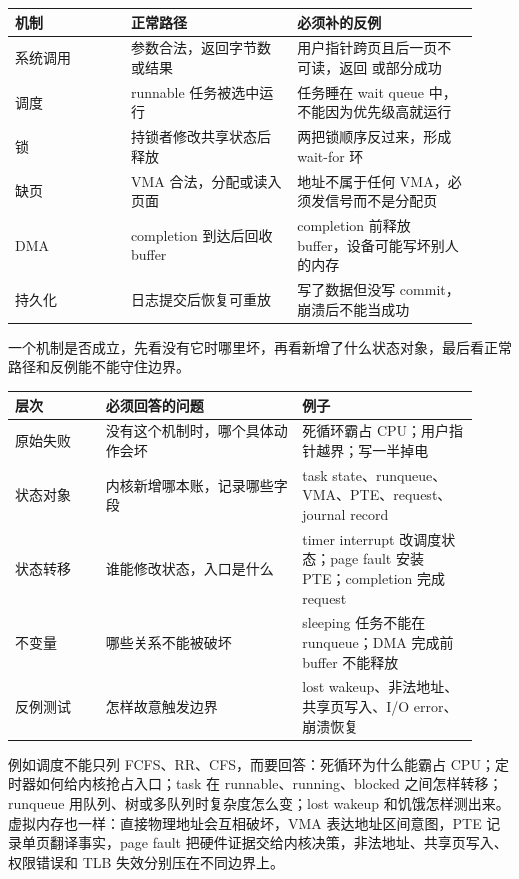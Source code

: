 \begin{longtable}{|L{0.23\linewidth}|L{0.33\linewidth}|L{0.36\linewidth}|}
\toprule
机制 & 正常路径 & 必须补的反例 \\
\midrule
系统调用 & 参数合法，返回字节数或结果 & 用户指针跨页且后一页不可读，返回  或部分成功 \\\tablerowrule
调度 & runnable 任务被选中运行 & 任务睡在 wait queue 中，不能因为优先级高就运行 \\\tablerowrule
锁 & 持锁者修改共享状态后释放 & 两把锁顺序反过来，形成 wait-for 环 \\\tablerowrule
缺页 & VMA 合法，分配或读入页面 & 地址不属于任何 VMA，必须发信号而不是分配页 \\\tablerowrule
DMA & completion 到达后回收 buffer & completion 前释放 buffer，设备可能写坏别人的内存 \\\tablerowrule
持久化 & 日志提交后恢复可重放 & 写了数据但没写 commit，崩溃后不能当成功 \\
\bottomrule
\end{longtable}

一个机制是否成立，先看没有它时哪里坏，再看新增了什么状态对象，最后看正常路径和反例能不能守住边界。

\begin{longtable}{|L{0.18\linewidth}|L{0.39\linewidth}|L{0.35\linewidth}|}
\toprule
层次 & 必须回答的问题 & 例子 \\
\midrule
原始失败 & 没有这个机制时，哪个具体动作会坏 & 死循环霸占 CPU；用户指针越界；写一半掉电 \\\tablerowrule
状态对象 & 内核新增哪本账，记录哪些字段 & task state、runqueue、VMA、PTE、request、journal record \\\tablerowrule
状态转移 & 谁能修改状态，入口是什么 & timer interrupt 改调度状态；page fault 安装 PTE；completion 完成 request \\\tablerowrule
不变量 & 哪些关系不能被破坏 & sleeping 任务不能在 runqueue；DMA 完成前 buffer 不能释放 \\\tablerowrule
反例测试 & 怎样故意触发边界 & lost wakeup、非法地址、共享页写入、I/O error、崩溃恢复 \\
\bottomrule
\end{longtable}

例如调度不能只列 FCFS、RR、CFS，而要回答：死循环为什么能霸占 CPU；定时器如何给内核抢占入口；task 在 runnable、running、blocked 之间怎样转移；runqueue 用队列、树或多队列时复杂度怎么变；lost wakeup 和饥饿怎样测出来。虚拟内存也一样：直接物理地址会互相破坏，VMA 表达地址区间意图，PTE 记录单页翻译事实，page fault 把硬件证据交给内核决策，非法地址、共享页写入、权限错误和 TLB 失效分别压在不同边界上。

